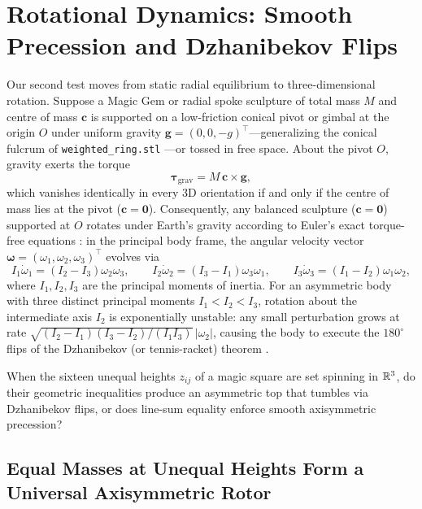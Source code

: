 \section{Rotational Dynamics: Smooth Precession and Dzhanibekov Flips}
\label{sec:dynamics}

Our second test moves from static radial equilibrium to three-dimensional rotation. Suppose a Magic Gem or radial spoke sculpture of total mass $M$ and centre of mass $\mathbf c$ is supported on a low-friction conical pivot or gimbal at the origin $O$ under uniform gravity $\mathbf g=(0,0,-g)^{\top}$—generalizing the conical fulcrum of \texttt{weighted\_ring.stl} \citep{mathewson2025magicgemweb}—or tossed in free space. About the pivot $O$, gravity exerts the torque
\[
\boldsymbol\tau_{\mathrm{grav}} = M\,\mathbf c \times \mathbf g,
\]
which vanishes identically in every 3D orientation if and only if the centre of mass lies at the pivot ($\mathbf c=\mathbf 0$). Consequently, any balanced sculpture ($\mathbf c=\mathbf 0$) supported at $O$ rotates under Earth's gravity according to Euler's exact torque-free equations \citep{arnold1989mathematical,goldstein2002classical}: in the principal body frame, the angular velocity vector $\boldsymbol\omega=(\omega_1,\omega_2,\omega_3)^{\top}$ evolves via
\begin{equation}
\label{eq:euler}
I_1\dot\omega_1 = (I_2-I_3)\omega_2\omega_3,\qquad
I_2\dot\omega_2 = (I_3-I_1)\omega_3\omega_1,\qquad
I_3\dot\omega_3 = (I_1-I_2)\omega_1\omega_2,
\end{equation}
where $I_1,I_2,I_3$ are the principal moments of inertia. For an asymmetric body with three distinct principal moments $I_1<I_2<I_3$, rotation about the intermediate axis $I_2$ is exponentially unstable: any small perturbation grows at rate $\sqrt{(I_2-I_1)(I_3-I_2)/(I_1I_3)}\,|\omega_2|$, causing the body to execute the $180^\circ$ flips of the Dzhanibekov (or tennis-racket) theorem \citep{ashbaugh1991twisting,poinsot1834theorie}.

When the sixteen unequal heights $z_{ij}$ of a magic square are set spinning in $\mathbb{R}^3$, do their geometric inequalities produce an asymmetric top that tumbles via Dzhanibekov flips, or does line-sum equality enforce smooth axisymmetric precession?

\subsection{Equal Masses at Unequal Heights Form a Universal Axisymmetric Rotor}

